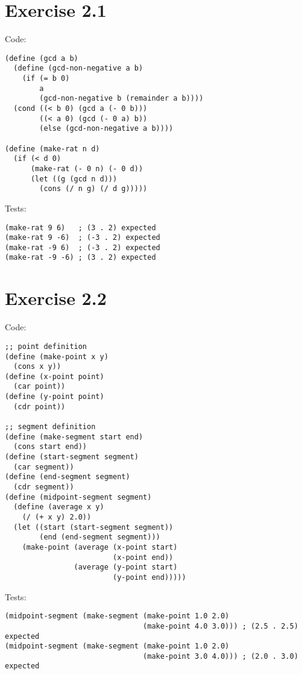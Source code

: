 \documentclass[../main.tex]{subfiles}
\begin{document}
\section{Exercise 2.1}

Code:

\begin{lstlisting}
(define (gcd a b)
  (define (gcd-non-negative a b)
    (if (= b 0)
        a
        (gcd-non-negative b (remainder a b))))
  (cond ((< b 0) (gcd a (- 0 b)))
        ((< a 0) (gcd (- 0 a) b))
        (else (gcd-non-negative a b))))

(define (make-rat n d)
  (if (< d 0)
      (make-rat (- 0 n) (- 0 d))
      (let ((g (gcd n d)))
        (cons (/ n g) (/ d g)))))
\end{lstlisting}

Tests:

\begin{lstlisting}
(make-rat 9 6)   ; (3 . 2) expected
(make-rat 9 -6)  ; (-3 . 2) expected
(make-rat -9 6)  ; (-3 . 2) expected
(make-rat -9 -6) ; (3 . 2) expected
\end{lstlisting}

\section{Exercise 2.2}

Code:

\begin{lstlisting}
;; point definition
(define (make-point x y)
  (cons x y))
(define (x-point point)
  (car point))
(define (y-point point)
  (cdr point))

;; segment definition
(define (make-segment start end)
  (cons start end))
(define (start-segment segment)
  (car segment))
(define (end-segment segment)
  (cdr segment))
(define (midpoint-segment segment)
  (define (average x y)
    (/ (+ x y) 2.0))
  (let ((start (start-segment segment))
        (end (end-segment segment)))
    (make-point (average (x-point start)
                         (x-point end))
                (average (y-point start)
                         (y-point end)))))
\end{lstlisting}

Tests:

\begin{lstlisting}
(midpoint-segment (make-segment (make-point 1.0 2.0)
                                (make-point 4.0 3.0))) ; (2.5 . 2.5) expected
(midpoint-segment (make-segment (make-point 1.0 2.0)
                                (make-point 3.0 4.0))) ; (2.0 . 3.0) expected
\end{lstlisting}
\end{document}
